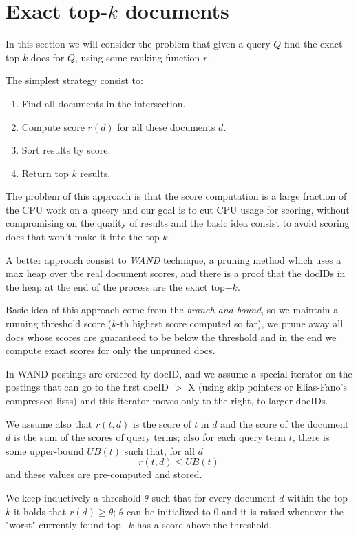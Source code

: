 \section{Exact top-$k$ documents}
In this section we will consider the problem that given a query $Q$
find the exact top $k$ docs for $Q$, using some ranking function $r$.

The simplest strategy consist to:
\begin{enumerate}
    \item Find all documents in the intersection.
    \item Compute score $r(d)$ for all these documents $d$.
    \item Sort results by score. 
    \item Return top $k$ results.
\end{enumerate}
The problem of this approach is that the score computation is a large fraction
of the CPU work on a queery and our goal is to cut CPU usage for scoring,
without compromising on the quality of results and the basic idea consist
to avoid scoring docs that won't make it into the top $k$.

A better approach consist to \emph{WAND} technique, a pruning method which
uses a max heap over the real document scores, and there is a proof that 
the docIDs in the heap at the end of the process are the exact top$-k$.

Basic idea of this approach come from the \emph{branch and bound}, so 
we maintain a running threshold score ($k$-th highest score computed so far),
we prune away all docs whose scores are guaranteed to be below the threshold
and in the end we compute exact scores for only the unpruned docs.

In WAND postings are ordered by docID, and we assume a special iterator on the 
postings that can go to the first docID $>$ X (using skip pointers or 
Elias-Fano's compressed lists) and this iterator moves only to the right,
to larger docIDs.

We assume also that $r(t, d)$ is the score of $t$ in $d$ and the score of the 
document $d$ is the sum of the scores of query terms; also for each query 
term $t$, there is some upper-bound $UB(t)$ such that, for all $d$
\[ r(t, d) \leq UB(t) \]
and these values are pre-computed and stored.

We keep inductively a threshold $\theta$ such that for every document $d$
within the top-$k$ it holds that $r(d) \geq \theta$; $\theta$ can be initialized
to $0$ and it is raised whenever the "worst" currently found top$-k$ has a 
score above the threshold.

